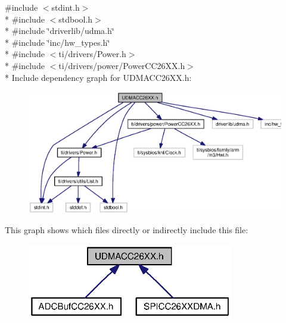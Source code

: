 {\ttfamily \#include $<$stdint.\+h$>$}\\*
{\ttfamily \#include $<$stdbool.\+h$>$}\\*
{\ttfamily \#include \char`\"{}driverlib/udma.\+h\char`\"{}}\\*
{\ttfamily \#include \char`\"{}inc/hw\+\_\+types.\+h\char`\"{}}\\*
{\ttfamily \#include $<$ti/drivers/\+Power.\+h$>$}\\*
{\ttfamily \#include $<$ti/drivers/power/\+Power\+C\+C26\+X\+X.\+h$>$}\\*
Include dependency graph for U\+D\+M\+A\+C\+C26\+X\+X.\+h\+:
\nopagebreak
\begin{figure}[H]
\begin{center}
\leavevmode
\includegraphics[width=350pt]{_u_d_m_a_c_c26_x_x_8h__incl}
\end{center}
\end{figure}
This graph shows which files directly or indirectly include this file\+:
\nopagebreak
\begin{figure}[H]
\begin{center}
\leavevmode
\includegraphics[width=255pt]{_u_d_m_a_c_c26_x_x_8h__dep__incl}
\end{center}
\end{figure}

